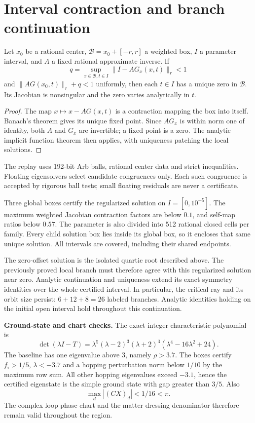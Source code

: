 \documentclass[11pt,a4paper]{article}
\begin{document}
\section{Interval contraction and branch continuation}
\begin{lemma}
Let $x_0$ be a rational center, $\mathcal B=x_0+[-r,r]$ a weighted box, $I$ a parameter interval, and $A$ a fixed rational approximate inverse. If
\[
q=\sup_{x\in\mathcal B,t\in I}\|I-AG_x(x,t)\|_r<1
\]
and $\|AG(x_0,t)\|_r+q<1$ uniformly, then each $t\in I$ has a unique zero in $\mathcal B$. Its Jacobian is nonsingular and the zero varies analytically in $t$.
\end{lemma}
\begin{proof}
The map $x\mapsto x-AG(x,t)$ is a contraction mapping the box into itself. Banach's theorem gives its unique fixed point. Since $AG_x$ is within norm one of identity, both $A$ and $G_x$ are invertible; a fixed point is a zero. The analytic implicit function theorem then applies, with uniqueness patching the local solutions.
\end{proof}
The replay uses 192-bit Arb balls, rational center data and strict inequalities. Floating eigensolvers select candidate congruences only. Each such congruence is accepted by rigorous ball tests; small floating residuals are never a certificate.

Three global boxes certify the regularized solution on $I=[0,10^{-5}]$. The maximum weighted Jacobian contraction factors are below $0.1$, and self-map ratios below $0.57$. The parameter is also divided into 512 rational closed cells per family. Every child solution box lies inside its global box, so it encloses that same unique solution. All intervals are covered, including their shared endpoints.

The zero-offset solution is the isolated quartic root described above. The previously proved local branch must therefore agree with this regularized solution near zero. Analytic continuation and uniqueness extend its exact symmetry identities over the whole certified interval. In particular, the critical ray and its orbit size persist: $6+12+8=26$ labeled branches. Analytic identities holding on the initial open interval hold throughout this continuation.

\textbf{Ground-state and chart checks.} The exact integer characteristic polynomial is
\[
\det(\lambda I-T)=\lambda^5(\lambda-2)^3(\lambda+2)^3
(\lambda^4-16\lambda^2+24).
\]
The baseline has one eigenvalue above 3, namely $\rho>3.7$. The boxes certify $f_i>1/5$, $\lambda<-3.7$ and a hopping perturbation norm below $1/10$ by the maximum row sum. All other hopping eigenvalues exceed $-3.1$, hence the certified eigenstate is the simple ground state with gap greater than $3/5$. Also
\[
\max_d|(CX)_d|<1/16<\pi.
\]
The complex loop phase chart and the matter dressing denominator therefore remain valid throughout the region.
\newpage
\end{document}
